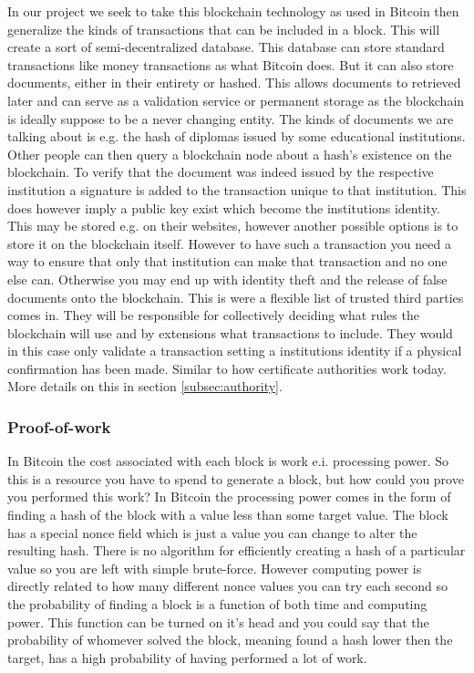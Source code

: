 \documentclass[11pt]{article}
\begin{document}
In our project we seek to take this blockchain technology as used in Bitcoin then generalize the kinds of transactions that can be included in a block. This will create a sort of semi-decentralized database. This database can store standard transactions like money transactions as what Bitcoin does. But it can also store documents, either in their entirety or hashed. This allows documents to retrieved later and can serve as a validation service or permanent storage as the blockchain is ideally suppose to be a never changing entity. The kinds of documents we are talking about is e.g. the hash of diplomas issued by some educational institutions. Other people can then query a blockchain node about a hash's existence on the blockchain. To verify that the document was indeed issued by the respective institution a signature is added to the transaction unique to that institution. This does however imply a public key exist which become the institutions identity. This may be stored e.g. on their websites, however another possible options is to store it on the blockchain itself. However to have such a transaction you need a way to ensure that only that institution can make that transaction and no one else can. Otherwise you may end up with identity theft and the release of false documents onto the blockchain. This is were a flexible list of trusted third parties comes in. They will be responsible for collectively deciding what rules the blockchain will use and by extensions what transactions to include. They would in this case only validate a transaction setting a institutions identity if a physical confirmation has been made. Similar to how certificate authorities work today. More details on this in section \ref{subsec:authority}.


\subsubsection{Proof-of-work}\label{subsubsec:proofofwork}
In Bitcoin the cost associated with each block is work e.i. processing power. So this is a resource you have to spend to generate a block, but how could you prove you performed this work? In Bitcoin the processing power comes in the form of finding a hash of the block with a value less than some target value. The block has a special nonce field which is just a value you can change to alter the resulting hash. There is no algorithm for efficiently creating a hash of a particular value so you are left with simple brute-force. However computing power is directly related to how many different nonce values you can try each second so the probability of finding a block is a function of both time and computing power. This function can be turned on it's head and you could say that the probability of whomever solved the block, meaning found a hash lower then the target, has a high probability of having performed a lot of work.
\end{document}
